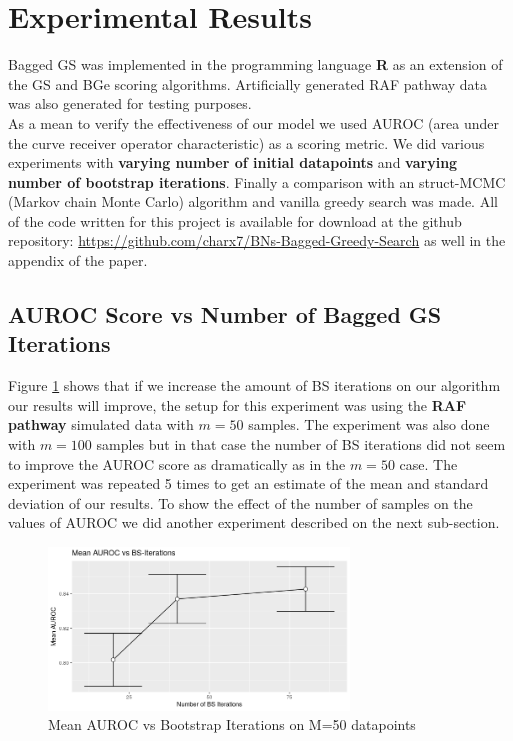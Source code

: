 \documentclass{article}
\begin{document}
	\section{Experimental Results}
	Bagged GS was implemented in the programming language \textbf{R} as an
	extension of the GS and BGe scoring algorithms. Artificially generated RAF
	pathway data was also generated for testing purposes. \\
	As a mean to verify the effectiveness of our model we used
	AUROC (area under the curve receiver operator characteristic) as a scoring
	metric. We did various experiments with \textbf{varying number of initial
	datapoints} and \textbf{varying number of bootstrap iterations}. Finally a
	comparison with an struct-MCMC (Markov chain Monte Carlo)  algorithm and
	vanilla greedy search was made. All of the code written for this project is available for download at
	the github repository: \url{https://github.com/charx7/BNs-Bagged-Greedy-Search} as well in the appendix of the paper.
	\subsection{AUROC Score vs Number of Bagged GS Iterations}
	Figure \ref{fig:aurocBsIterations} shows that if we increase the amount of BS iterations on our
	algorithm our results will improve, the setup for this experiment was using
	the \textbf{RAF pathway} simulated data with $m=50$ samples. The experiment
	was also done with $m=100$ samples but in that case the number of BS
	iterations did not seem to improve the AUROC score as dramatically as in the
	$m=50$ case. The experiment was repeated 5 times to get an estimate of the
	mean and standard deviation of our results. To show the effect of the number of samples on the values of
	AUROC we did another experiment described on the next sub-section.
	\begin{figure}[ht]
		\includegraphics[width=8cm]{meanAUROCvsBSIterations}
		\centering
		\caption{Mean AUROC vs Bootstrap Iterations on M=50 datapoints}
		\label{fig:aurocBsIterations}
	\end{figure}
\end{document}
